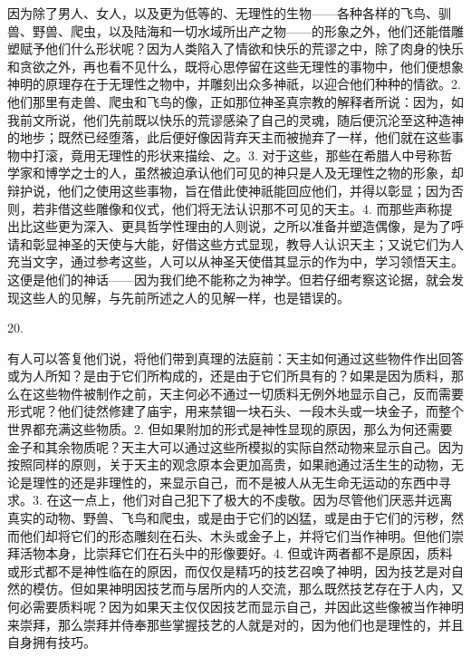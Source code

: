 因为除了男人、女人，以及更为低等的、无理性的生物——各种各样的飞鸟、驯兽、野兽、爬虫，以及陆海和一切水域所出产之物——的形象之外，他们还能借雕塑赋予他们什么形状呢？因为人类陷入了情欲和快乐的荒谬之中，除了肉身的快乐和贪欲之外，再也看不见什么，既将心思停留在这些无理性的事物中，他们便想象神明的原理存在于无理性之物中，并雕刻出众多神祇，以迎合他们种种的情欲。\newline{}2. 他们那里有走兽、爬虫和飞鸟的像，正如那位神圣真宗教的解释者所说：因为，如我前文所说，他们先前既以快乐的荒谬感染了自己的灵魂，随后便沉沦至这种造神的地步；既然已经堕落，此后便好像因背弃天主而被抛弃了一样，他们就在这些事物中打滚，竟用无理性的形状来描绘、之。\newline{}3. 对于这些，那些在希腊人中号称哲学家和博学之士的人，虽然被迫承认他们可见的神只是人及无理性之物的形象，却辩护说，他们之使用这些事物，旨在借此使神祇能回应他们，并得以彰显；因为否则，若非借这些雕像和仪式，他们将无法认识那不可见的天主。\newline{}4. 而那些声称提出比这些更为深入、更具哲学性理由的人则说，之所以准备并塑造偶像，是为了呼请和彰显神圣的天使与大能，好借这些方式显现，教导人认识天主；又说它们为人充当文字，通过参考这些，人可以从神圣天使借其显示的作为中，学习领悟天主。这便是他们的神话——因为我们绝不能称之为神学。但若仔细考察这论据，就会发现这些人的见解，与先前所述之人的见解一样，也是错误的。\par

20. \par

有人可以答复他们说，将他们带到真理的法庭前：天主如何通过这些物件作出回答或为人所知？是由于它们所构成的，还是由于它们所具有的？如果是因为质料，那么在这些物件被制作之前，天主何必不通过一切质料无例外地显示自己，反而需要形式呢？他们徒然修建了庙宇，用来禁锢一块石头、一段木头或一块金子，而整个世界都充满这些物质。2. 但如果附加的形式是神性显现的原因，那么为何还需要金子和其余物质呢？天主大可以通过这些所模拟的实际自然动物来显示自己。因为按照同样的原则，关于天主的观念原本会更加高贵，如果祂通过活生生的动物，无论是理性的还是非理性的，来显示自己，而不是被人从无生命无运动的东西中寻求。3. 在这一点上，他们对自己犯下了极大的不虔敬。因为尽管他们厌恶并远离真实的动物、野兽、飞鸟和爬虫，或是由于它们的凶猛，或是由于它们的污秽，然而他们却将它们的形态雕刻在石头、木头或金子上，并将它们当作神明。但他们崇拜活物本身，比崇拜它们在石头中的形像要好。4. 但或许两者都不是原因，质料或形式都不是神性临在的原因，而仅仅是精巧的技艺召唤了神明，因为技艺是对自然的模仿。但如果神明因技艺而与居所内的人交流，那么既然技艺存在于人内，又何必需要质料呢？因为如果天主仅仅因技艺而显示自己，并因此这些像被当作神明来崇拜，那么崇拜并侍奉那些掌握技艺的人就是对的，因为他们也是理性的，并且自身拥有技巧。\par

